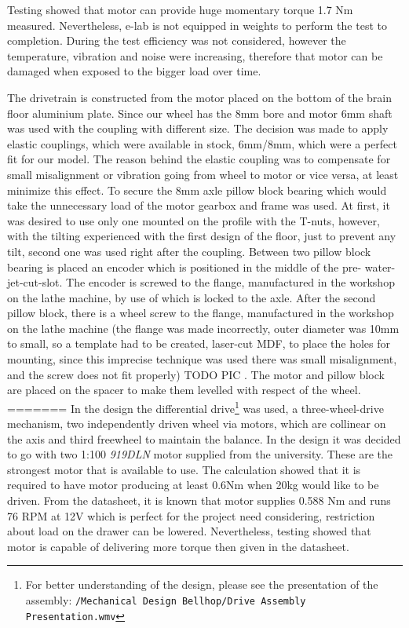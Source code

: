 \documentclass[11pt]{article}
\begin{document}
Testing showed that motor can provide huge momentary torque 1.7 Nm measured. Nevertheless, e-lab is not equipped in weights to perform the test to completion. During the test efficiency was not considered, however the temperature, vibration and noise were increasing, therefore that motor can be damaged when exposed to the bigger load over time.


The drivetrain is constructed from the motor placed on the bottom of the brain floor aluminium plate. Since our wheel has the 8mm bore and motor 6mm shaft was used with the coupling with different size. The decision was made to apply elastic couplings, which were available in stock, 6mm/8mm, which were a perfect fit for our model. The reason behind the elastic coupling was to compensate for small misalignment or vibration going from wheel to motor or vice versa, at least minimize this effect. To secure the 8mm axle pillow block bearing which would take the unnecessary load of the motor gearbox and frame was used. At first, it was desired to use only one mounted on the profile with the T-nuts, however, with the tilting experienced with the first design of the floor, just to prevent any tilt, second one was used right after the coupling. Between two pillow block bearing is placed an encoder which is positioned in the middle of the pre- water-jet-cut-slot. The encoder is screwed to the flange, manufactured in the workshop on the lathe machine, by use of which is locked to the axle. After the second pillow block, there is a wheel screw to the flange, manufactured in the workshop on the lathe machine (the flange was made incorrectly, outer diameter was 10mm to small, so a template had to be created, laser-cut MDF, to place the holes for mounting, since this imprecise technique was used there was small misalignment, and the screw does not fit properly) TODO PIC . The motor and pillow block are placed on the spacer to make them levelled with respect of the wheel.
=======
In the design the differential drive\footnote{For better understanding of the design, please see the presentation of the assembly: \texttt{/Mechanical Design Bellhop/Drive Assembly Presentation.wmv}} was used, a three-wheel-drive mechanism, two independently driven wheel via motors, which are collinear on the axis and third freewheel to maintain the balance. In the design it was decided to go with two 1:100 \textit{919DLN} motor supplied from the university. These are the strongest motor that is available to use. The calculation showed that it is required to have motor producing at least 0.6Nm when 20kg would like to be driven. From the datasheet, it is known that motor supplies 0.588 Nm and runs 76 RPM at 12V which is perfect for the project need considering, restriction about load on the drawer can be lowered. Nevertheless, testing showed that motor is capable of delivering more torque then given in the datasheet.
\end{document}

